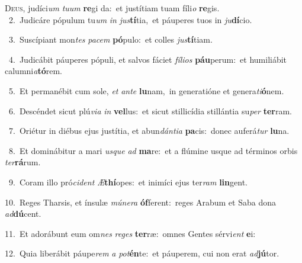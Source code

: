 \lettrine{\initial\textcolor{\initialcolor}{D}}{eus,} judíci\textit{um} \textit{tu}\-\textit{um} \textbf{re}\-gi da:~\star et justítiam tuam fíli\textit{o} \textbf{re}\-gis.\\
{\numbfont\textcolor{\numbcolor}{~2.}}~Judicáre pópulum tu\textit{um} \textit{in} \textit{jus}\-\textbf{tí}tia,~\star et páuperes tuos in \textit{ju}\-\textbf{dí}cio.\par
{\numbfont\textcolor{\numbcolor}{~3.}}~Suscípiant mon\textit{tes} \textit{pa}\-\textit{cem} \textbf{pó}\-pulo:~\star et colles \textit{jus}\-\textbf{tí}tiam.\par
{\numbfont\textcolor{\numbcolor}{~4.}}~Judicábit páuperes pópuli, et salvos fáciet \textit{fí}\-\textit{li}\textit{os} \textbf{páu}\-perum:~\star et humiliábit calumni\-\textit{a}\-\textbf{tó}rem.\par
{\numbfont\textcolor{\numbcolor}{~5.}}~Et permanébit cum sole, \textit{et} \textit{an}\-\textit{te} \textbf{lu}\-nam,~\star in generatióne et genera\-\textit{ti}\-\textbf{ó}nem.\par
{\numbfont\textcolor{\numbcolor}{~6.}}~Descéndet sicut plú\-\textit{vi}\-\textit{a} \textit{in} \textbf{vel}\-lus:~\star et sicut stillicídia stillántia su\textit{per} \textbf{ter}\-ram.\par
{\numbfont\textcolor{\numbcolor}{~7.}}~Oriétur in diébus ejus justítia, et abun\-\textit{dán}\-\textit{ti}\textit{a} \textbf{pa}\-cis:~\star donec auferá\textit{tur} \textbf{lu}\-na.\par
{\numbfont\textcolor{\numbcolor}{~8.}}~Et dominábitur a mari \textit{us}\-\textit{que} \textit{ad} \textbf{ma}\-re:~\star et a flúmine usque ad términos orbis \textit{ter}\-\textbf{rá}rum.\par
{\numbfont\textcolor{\numbcolor}{~9.}}~Coram illo pró\-\textit{ci}\-\textit{dent} \textit{Æ}\-\textbf{thí}opes:~\star et inimíci ejus ter\textit{ram} \textbf{lin}\-gent.\par
{\numbfont\textcolor{\numbcolor}{10.}}~Reges Tharsis, et ínsulæ \textit{mú}\-\textit{ne}\textit{ra} \textbf{óf}\-ferent:~\star reges Arabum et Saba dona \textit{ad}\-\textbf{dú}cent.\par
{\numbfont\textcolor{\numbcolor}{11.}}~Et adorábunt eum om\textit{nes} \textit{re}\-\textit{ges} \textbf{ter}\-ræ:~\star omnes Gentes sérvi\textit{ent} \textbf{e}\-i:\par
{\numbfont\textcolor{\numbcolor}{12.}}~Quia liberábit páupe\textit{rem} \textit{a} \textit{pot}\-\textbf{én}te:~\star et páuperem, cui non erat \textit{ad}\-\textbf{jú}tor.\par

